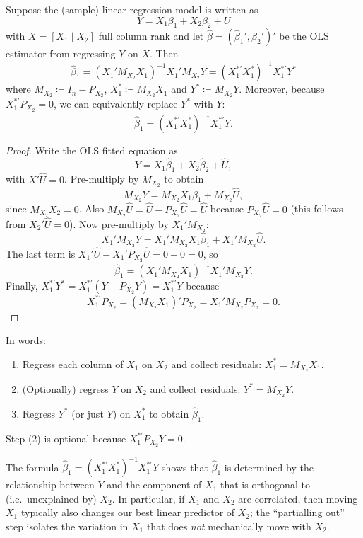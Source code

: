 \begin{proposition}
	Suppose the (sample) linear regression model is written as
	\[
		Y = X_1\beta_1 + X_2\beta_2 + U
	\]
	with $X=[X_1 \mid X_2]$ full column rank and let $\hat{\beta}=(\hat{\beta}_1',\hat{\beta}_2')'$ be the OLS estimator from regressing $Y$ on $X$.
	Then
	\[
		\hat{\beta}_1
		= (X_1' M_{X_2} X_1)^{-1} X_1' M_{X_2} Y
		= (X_1^{*'}X_1^*)^{-1} X_1^{*'} Y^*
	\]
	where $M_{X_2} \coloneqq I_n - P_{X_2}$, $X_1^* \coloneqq M_{X_2}X_1$ and $Y^* \coloneqq M_{X_2}Y$.
	Moreover, because $X_1^{*'}P_{X_2} = 0$, we can equivalently replace $Y^*$ with $Y$:
	\[
		\hat{\beta}_1 = (X_1^{*'}X_1^*)^{-1} X_1^{*'} Y.
	\]
\end{proposition}
\begin{proof}
	Write the OLS fitted equation as
	\[
		Y = X_1\hat{\beta}_1 + X_2\hat{\beta}_2 + \hat{U},
	\]
	with $X'\hat{U}=0$.
	Pre-multiply by $M_{X_2}$ to obtain
	\[
		M_{X_2}Y = M_{X_2}X_1\hat{\beta}_1 + M_{X_2}\hat{U},
	\]
	since $M_{X_2}X_2=0$.
	Also $M_{X_2}\hat{U}=\hat{U}-P_{X_2}\hat{U}=\hat{U}$ because $P_{X_2}\hat{U}=0$ (this follows from $X_2'\hat{U}=0$).
	Now pre-multiply by $X_1' M_{X_2}$:
	\[
		X_1'M_{X_2}Y = X_1'M_{X_2}X_1\hat{\beta}_1 + X_1'M_{X_2}\hat{U}.
	\]
	The last term is $X_1'\hat{U} - X_1'P_{X_2}\hat{U}=0-0=0$, so
	\[
		\hat{\beta}_1 = (X_1'M_{X_2}X_1)^{-1}X_1'M_{X_2}Y.
	\]
	Finally, $X_1^{*'}Y^* = X_1^{*'}(Y-P_{X_2}Y)=X_1^{*'}Y$ because
	\[
		X_1^{*'}P_{X_2} = (M_{X_2}X_1)'P_{X_2} = X_1' M_{X_2} P_{X_2} = 0.
	\]
\end{proof}

\begin{remark}
	In words:
	\begin{enumerate}[label=(\roman*)]
		\item Regress each column of $X_1$ on $X_2$ and collect residuals: $X_1^* = M_{X_2}X_1$.
		\item (Optionally) regress $Y$ on $X_2$ and collect residuals: $Y^* = M_{X_2}Y$.
		\item Regress $Y^*$ (or just $Y$) on $X_1^*$ to obtain $\hat{\beta}_1$.
	\end{enumerate}
	Step (2) is optional because $X_1^{*'}P_{X_2}Y=0$.
\end{remark}

\begin{remark}
	The formula $\hat{\beta}_1 = (X_1^{*'}X_1^*)^{-1}X_1^{*'}Y$ shows that $\hat{\beta}_1$ is determined by the relationship between $Y$ and the component of $X_1$ that is orthogonal to (i.e.\ unexplained by) $X_2$.
	In particular, if $X_1$ and $X_2$ are correlated, then moving $X_1$ typically also changes our best linear predictor of $X_2$; the ``partialling out'' step isolates the variation in $X_1$ that does \emph{not} mechanically move with $X_2$.
\end{remark}

